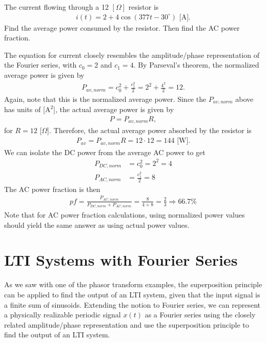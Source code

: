 \documentclass{report}
\begin{document}
\begin{example}
    The current flowing through a 12 $[\Omega]$ resistor is 
    \begin{align*}
        i(t)=2+4\cos(377t-30^{\circ}) \text{ [A]}.
    \end{align*} Find the average power consumed by the resistor. Then find the AC power fraction.
\end{example}
\begin{solution}
    The equation for current closely resembles the amplitude/phase representation of the Fourier series, with $c_0=2$ and $c_1=4$. By Parseval's theorem, the normalized average power is given by 
    \begin{align*}
        P_{av,norm} = c_0^2 + \frac{c_1^2}{2} = 2^2 + \frac{4^2}{2} = 12. 
    \end{align*} 
    Again, note that this is the normalized average power. Since the $P_{av,norm}$ above has units of [$\text{A}^2$], the actual average power is given by 
    \begin{align*}
        P = P_{av,norm}R,
    \end{align*}
    for $R=12$ [$\Omega$]. Therefore, the actual average power absorbed by the resistor is 
    \begin{align*}
        P_{av} = P_{av,norm}R = 12\cdot 12 = 144 \text{ [W]}.
    \end{align*}
    We can isolate the DC power from the average AC power to get 
    \begin{align*}
        P_{DC,norm} &= c_0^2 = 2^2 = 4 \\
        P_{AC,norm} &= \frac{c_1^2}{2} = 8
    \end{align*}
    The AC power fraction is then
    \begin{align*}
        pf = \frac{P_{AC,norm}}{P_{DC,norm} + P_{AC,norm}} = \frac{8}{4+8} = \frac{2}{3} \Longrightarrow 66.7\%
    \end{align*}
    Note that for AC power fraction calculations, using normalized power values should yield the same answer as using actual power values.
\end{solution}

\section{LTI Systems with Fourier Series}
As we saw with one of the phasor transform examples, the superposition principle can be applied to find the output of an LTI system, given that the input signal is a finite sum of sinusoids. Extending the notion to Fourier series, we can represent a physically realizable 
periodic signal $x(t)$ as a Fourier series using the closely related amplitude/phase representation and use the superposition principle to find the output of an LTI system.
\end{document}

